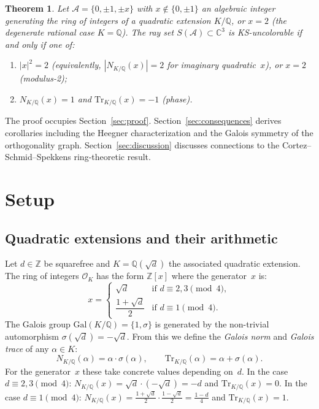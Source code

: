 \documentclass[12pt,a4paper]{article}
\newtheorem{theorem}{Theorem}
\newcommand{\C}{\mathbb{C}}
\newcommand{\Z}{\mathbb{Z}}
\newcommand{\Q}{\mathbb{Q}}
\newcommand{\Norm}[1]{N_{K/\Q}\!\left(#1\right)}
\newcommand{\Tr}[1]{\mathrm{Tr}_{K/\Q}\!\left(#1\right)}
\newcommand{\Gal}{\mathrm{Gal}}
\begin{document}
\begin{theorem}\label{thm:main}
Let $\mathcal{A} = \{0,\pm 1,\pm x\}$ with $x \notin \{0, \pm 1\}$ an
algebraic integer generating the ring of integers of a quadratic
extension $K/\Q$, or $x = 2$ (the degenerate rational case $K = \Q$).
The ray set $S(\mathcal{A}) \subset \C^3$ is KS-uncolorable if and only
if one of:
\begin{enumerate}
  \item[(i)] $|x|^2 = 2$ (equivalently, $|\Norm{x}| = 2$ for imaginary
    quadratic~$x$), or $x = 2$ \emph{(modulus-2)};
  \item[(ii)] $\Norm{x} = 1$ and $\Tr{x} = -1$ \emph{(phase)}.
\end{enumerate}
\end{theorem}

The proof occupies Section~\ref{sec:proof}.  Section~\ref{sec:consequences}
derives corollaries including the Heegner characterization and the
Galois symmetry of the orthogonality graph.  Section~\ref{sec:discussion} discusses
connections to the Cortez--Schmid--Spekkens ring-theoretic result.

\section{Setup}\label{sec:setup}

\subsection{Quadratic extensions and their arithmetic}

Let $d \in \Z$ be squarefree and $K = \Q(\sqrt{d})$ the associated
quadratic extension.  The ring of integers $\mathcal{O}_K$ has the form
$\Z[x]$ where the generator~$x$ is:
\[
  x = \begin{cases}
    \sqrt{d} & \text{if } d \equiv 2, 3 \pmod{4}, \\
    \dfrac{1 + \sqrt{d}}{2} & \text{if } d \equiv 1 \pmod{4}.
  \end{cases}
\]
The Galois group $\Gal(K/\Q) = \{1, \sigma\}$ is generated by the
non-trivial automorphism $\sigma(\sqrt{d}) = -\sqrt{d}$.  From this we
define the \emph{Galois norm} and \emph{Galois trace} of any $\alpha \in
K$:
\[
  \Norm{\alpha} = \alpha \cdot \sigma(\alpha), \qquad
  \Tr{\alpha} = \alpha + \sigma(\alpha).
\]
For the generator~$x$ these take concrete values depending on~$d$.  In
the case $d \equiv 2, 3 \pmod{4}$: $\Norm{x} = \sqrt{d} \cdot
(-\sqrt{d}) = -d$ and $\Tr{x} = 0$.  In the case $d \equiv 1 \pmod{4}$:
$\Norm{x} = \tfrac{1+\sqrt{d}}{2} \cdot \tfrac{1-\sqrt{d}}{2} =
\tfrac{1-d}{4}$ and $\Tr{x} = 1$.
\end{document}
